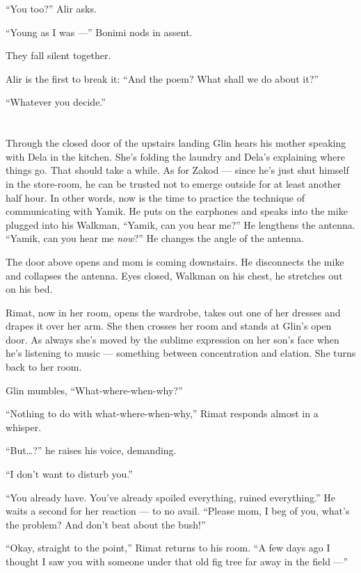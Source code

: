 \documentclass[twoside,11pt,openany]{book}
\begin{document}
``You too?'' Alir asks.

``Young as I was ---'' Bonimi nods in assent.

They fall silent together.

Alir is the first to break it: ``And the poem? What shall we do about it?''

``Whatever you decide.''


\chapter{}

Through the closed door of the upstairs landing Glin hears his mother speaking with Dela in the kitchen.  She's
folding the laundry and Dela's explaining where things go. That should take a while. As for Zakod --- since he's just
shut himself in the store-room, he can be trusted not to emerge outside for at least another half hour. In other words,
now is the time to practice the technique of communicating with Yamik. He puts on the earphones and speaks into the
mike plugged into his Walkman, ``Yamik, can you hear me?'' He lengthens the antenna.
``Yamik, can you hear me \textit{now}?'' He changes the angle of the antenna.

The door above opens and mom is coming downstairs. He disconnects the mike and collapses{ }the antenna.
Eyes closed, Walkman on his chest, he stretches out on his bed.

Rimat, now in her room, opens the wardrobe, takes out one of her dresses and drapes it over her arm. She then crosses
her room and stands at Glin's open door. As always she's moved by the sublime expression on her son's face when he's
listening to music --- something between concentration and elation. She turns back to her room.

Glin mumbles, ``What-where-when-why?''

``Nothing to do with what-where-when-why,'' Rimat responds almost in a whisper.

``But{\ldots}?'' he raises his voice, demanding.

``I don't want to disturb you.''

``You already have. You've already spoiled everything, ruined everything.'' He waits a second
for her reaction --- to no avail. ``Please mom, I beg of you, what's   the problem?  And don't beat
about the bush!''

``Okay, straight to the point,'' Rimat returns to his room. ``A few days ago I
thought I saw you with someone under that old fig tree far away in the field ---''
\end{document}
